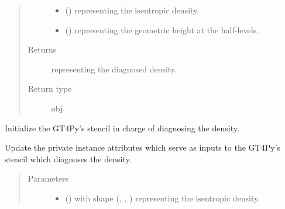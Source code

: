 \documentclass[letterpaper,10pt,english]{sphinxmanual}
\begin{document}
\begin{fulllineitems}
\begin{fulllineitems}
\begin{quote}
\begin{description}
\begin{itemize}
\item {} 
 () \textendash{}  representing the isentropic density.

\item {} 
 () \textendash{}  representing the geometric height at the half-levels.

\end{itemize}

\item[{Returns}] \leavevmode
{} representing the diagnosed density.

\item[{Return type}] \leavevmode
obj

\end{description}\end{quote}

\end{fulllineitems}


\begin{fulllineitems}
\label{\detokenize{api:dycore.diagnostic_isentropic.DiagnosticIsentropic._stencil_diagnosing_air_density_initialize}}
Initialize the GT4Py’s stencil in charge of diagnosing the density.

\end{fulllineitems}


\begin{fulllineitems}
\label{\detokenize{api:dycore.diagnostic_isentropic.DiagnosticIsentropic._stencil_diagnosing_air_density_set_inputs}}
Update the private instance attributes which serve as inputs to the GT4Py’s stencil which diagnoses the density.
\begin{quote}\begin{description}
\item[{Parameters}] \leavevmode\begin{itemize}
\item {} 
 () \textendash{}  with shape (, , ) representing the isentropic density.


\end{itemize}
\end{description}
\end{quote}
\end{fulllineitems}
\end{fulllineitems}
\end{document}
